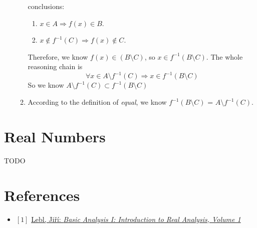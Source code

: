 \documentclass[12pt, letterpaper, oneside]{book}
\begin{document}
\begin{enumerate}
\begin{enumerate}
        conclusions:
        \begin{enumerate}
          \item $x \in A \Rightarrow f(x) \in B$.
          \item $x \notin f^{-1}(C) \Rightarrow f(x) \notin C$.
        \end{enumerate}
        Therefore, we know $f(x) \in (B \setminus C)$, so $x \in f^{-1}(B
          \setminus C)$. The whole
        reasoning chain is
        \[
          \forall x \in A \setminus f^{-1}(C) \Rightarrow x \in f^{-1}(B
          \setminus C)
        \]
        So we know $A \setminus f^{-1}(C) \subset f^{-1}(B \setminus C)$
      \item According to the definition of \textit{equal}, we know $f^{-1}(B
        \setminus C)$ = $A \setminus f^{-1}(C)$.
    \end{enumerate}
\end{enumerate}

%
%

\chapter{Real Numbers}

TODO

\chapter*{References}

\begin{itemize}
  \item $[1]$ \href{https://ocw.mit.edu/courses/18-100a-real-analysis-fall-2020/resources/mit18_100af20_basic_analysis/}{Lebl, Jiří: \it{Basic Analysis I: Introduction to Real Analysis, Volume 1}}
\end{itemize}
\end{document}
